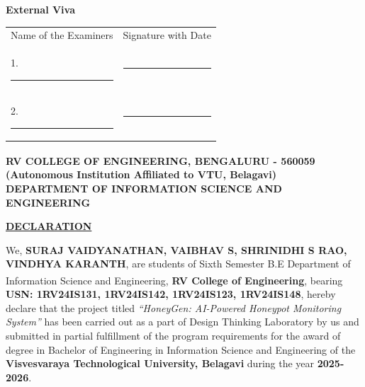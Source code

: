 \documentclass[12pt,a4paper]{report}
\begin{document}
\vspace{1cm}

\begin{center}
\textbf{External Viva}
\end{center}

\vspace{0.3cm}

\begin{tabular}{@{}p{7cm}p{7cm}@{}}
Name of the Examiners & Signature with Date \\[0.8cm]
1. \rule{4cm}{0.4pt} & \rule{4cm}{0.4pt} \\[0.8cm]
2. \rule{4cm}{0.4pt} & \rule{4cm}{0.4pt} \\
\end{tabular}

\newpage
\thispagestyle{empty}

\begin{center}
{\large \textbf{RV COLLEGE OF ENGINEERING\textsuperscript{\textregistered}, BENGALURU - 560059}}\\[0.1cm]
{\large \textbf{(Autonomous Institution Affiliated to VTU, Belagavi)}}\\[0.5cm]
{\large \textbf{DEPARTMENT OF INFORMATION SCIENCE AND ENGINEERING}}
\end{center}

\vspace{1.5cm}

\begin{center}
{\LARGE \textbf{\underline{DECLARATION}}}
\end{center}

\vspace{1cm}

\begin{justify}
We, \textbf{SURAJ VAIDYANATHAN, VAIBHAV S, SHRINIDHI S RAO, VINDHYA KARANTH}, are students of Sixth Semester B.E Department of Information Science and Engineering, \textbf{RV College of Engineering\textsuperscript{\textregistered}}, bearing \textbf{USN: 1RV24IS131, 1RV24IS142, 1RV24IS123, 1RV24IS148}, hereby declare that the project titled \textit{``HoneyGen: AI-Powered Honeypot Monitoring System''} has been carried out as a part of Design Thinking Laboratory by us and submitted in partial fulfillment of the program requirements for the award of degree in Bachelor of Engineering in Information Science and Engineering of the \textbf{Visvesvaraya Technological University, Belagavi} during the year \textbf{2025-2026}.
\end{justify}
\end{document}
